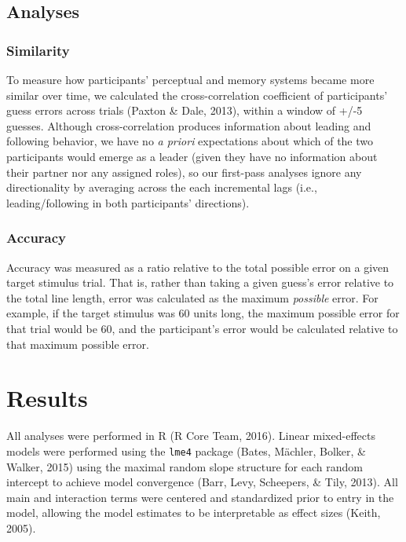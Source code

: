 \documentclass[10pt, letterpaper]{article}
\begin{document}
\subsection{Analyses}\label{analyses}

\subsubsection{Similarity}\label{similarity}

To measure how participants' perceptual and memory systems became more
similar over time, we calculated the cross-correlation coefficient of
participants' guess errors across trials (Paxton \& Dale, 2013), within
a window of +/-5 guesses. Although cross-correlation produces
information about leading and following behavior, we have no \emph{a
priori} expectations about which of the two participants would emerge as
a leader (given they have no information about their partner nor any
assigned roles), so our first-pass analyses ignore any directionality by
averaging across the each incremental lags (i.e., leading/following in
both participants' directions).

\subsubsection{Accuracy}\label{accuracy}

Accuracy was measured as a ratio relative to the total possible error on
a given target stimulus trial. That is, rather than taking a given
guess's error relative to the total line length, error was calculated as
the maximum \emph{possible} error. For example, if the target stimulus
was 60 units long, the maximum possible error for that trial would be
60, and the participant's error would be calculated relative to that
maximum possible error.

\section{Results}\label{results}

All analyses were performed in R (R Core Team, 2016). Linear
mixed-effects models were performed using the \texttt{lme4} package
(Bates, Mächler, Bolker, \& Walker, 2015) using the maximal random slope
structure for each random intercept to achieve model convergence (Barr,
Levy, Scheepers, \& Tily, 2013). All main and interaction terms were
centered and standardized prior to entry in the model, allowing the
model estimates to be interpretable as effect sizes (Keith, 2005).
\end{document}
